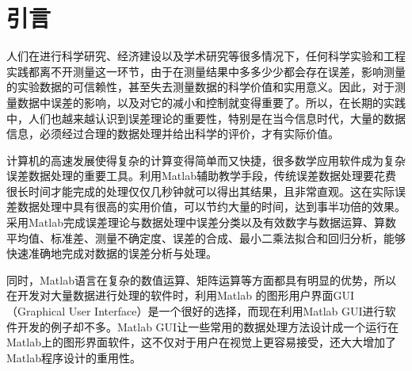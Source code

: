 \part*{引言}
人们在进行科学研究、经济建设以及学术研究等很多情况下，任何科学实验和工程实践都离不开测量这一环节，由于在测量结果中多多少少都会存在误差，影响测量的实验数据的可信赖性，甚至失去测量数据的科学价值和实用意义。因此，对于测量数据中误差的影响，以及对它的减小和控制就变得重要了。所以，在长期的实践中，人们也越来越认识到误差理论的重要性，特别是在当今信息时代，大量的数据信息，必须经过合理的数据处理并给出科学的评价，才有实际价值。

计算机的高速发展使得复杂的计算变得简单而又快捷，很多数学应用软件成为复杂误差数据处理的重要工具。利用Matlab辅助教学手段，传统误差数据处理要花费很长时间才能完成的处理仅仅几秒钟就可以得出其结果，且非常直观。这在实际误差数据处理中具有很高的实用价值，可以节约大量的时间，达到事半功倍的效果。采用Matlab完成误差理论与数据处理中误差分类以及有效数字与数据运算、算数平均值、标准差、测量不确定度、误差的合成、最小二乘法拟合和回归分析，能够快速准确地完成对数据的误差分析与处理。

同时，Matlab语言在复杂的数值运算、矩阵运算等方面都具有明显的优势，所以在开发对大量数据进行处理的软件时，利用Matlab 的图形用户界面GUI（Graphical User Interface）是一个很好的选择，而现在利用Matlab GUI进行软件开发的例子却不多。Matlab GUI让一些常用的数据处理方法设计成一个运行在Matlab上的图形界面软件，这不仅对于用户在视觉上更容易接受，还大大增加了Matlab程序设计的重用性。

